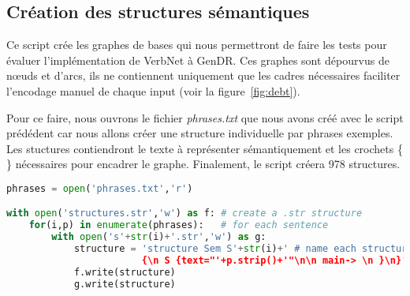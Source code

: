 \subsection{Création des structures sémantiques}

Ce script crée les graphes de bases qui nous permettront de faire les tests pour évaluer l'implémentation de VerbNet à GenDR. Ces graphes sont dépourvus de n\oe{}uds et d'arcs, ils ne contiennent uniquement que les cadres nécessaires faciliter l'encodage manuel de chaque input (voir la figure~\ref{fig:debt}).

Pour ce faire, nous ouvrons le fichier \emph{phrases.txt} que nous avons créé avec le script prédédent car nous allons créer une structure individuelle par phrases exemples. Les stuctures contiendront le texte à représenter sémantiquement et les crochets \{ \} nécessaires pour encadrer le graphe. Finalement, le script créera 978 structures.

\begin{lstlisting}[language=Python, caption = Code pour créer les structures sémantiques vides, label=structurepython]
phrases = open('phrases.txt','r')

with open('structures.str','w') as f: # create a .str structure
    for(i,p) in enumerate(phrases):   # for each sentence
        with open('s'+str(i)+'.str','w') as g:
            structure = 'structure Sem S'+str(i)+' # name each structure by enumeration
						{\n S {text="'+p.strip()+'"\n\n main-> \n }\n}' # insert as texte the sentence
            f.write(structure)
            g.write(structure)
\end{lstlisting}

